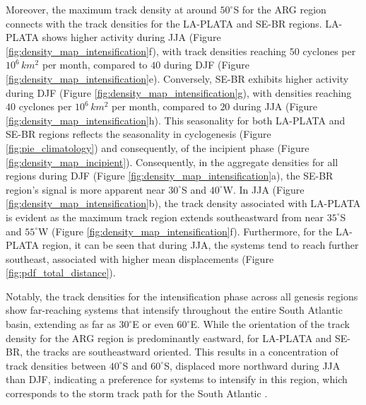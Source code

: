 Moreover, the maximum track density at around \(50^\circ\)S for the ARG region connects with the track densities for the LA-PLATA and SE-BR regions. LA-PLATA shows higher activity during JJA (Figure \ref{fig:density_map_intensification}f), with track densities reaching \(50\) cyclones per \(10^6 \, km^2\) per month, compared to \(40\) during DJF (Figure \ref{fig:density_map_intensification}e). Conversely, SE-BR exhibits higher activity during DJF (Figure \ref{fig:density_map_intensification}g), with densities reaching \(40\) cyclones per \(10^6 \, km^2\) per month, compared to \(20\) during JJA (Figure \ref{fig:density_map_intensification}h). This seasonality for both LA-PLATA and SE-BR regions reflects the seasonality in cyclogenesis (Figure \ref{fig:pie_climatology}) and consequently, of the incipient phase (Figure \ref{fig:density_map_incipient}).  Consequently, in the aggregate densities for all regions during DJF (Figure \ref{fig:density_map_intensification}a), the SE-BR region's signal is more apparent near \(30^\circ\)S and \(40^\circ\)W. In JJA (Figure \ref{fig:density_map_intensification}b), the track density associated with LA-PLATA is evident as the maximum track region extends southeastward from near \(35^\circ\)S and \(55^\circ\)W (Figure \ref{fig:density_map_intensification}f). Furthermore, for the LA-PLATA region, it can be seen that during JJA, the systems tend to reach further southeast, associated with higher mean displacements (Figure \ref{fig:pdf_total_distance}).

Notably, the track densities for the intensification phase across all genesis regions show far-reaching systems that intensify throughout the entire South Atlantic basin, extending as far as \(30^\circ\)E or even \(60^\circ\)E. While the orientation of the track density for the ARG region is predominantly eastward, for LA-PLATA and SE-BR, the tracks are southeastward oriented. This results in a concentration of track densities between \(40^\circ\)S and \(60^\circ\)S, displaced more northward during JJA than DJF, indicating a preference for systems to intensify in this region, which corresponds to the storm track path for the South Atlantic \citep{hoskins2005new, gramcianinov2019properties}.


